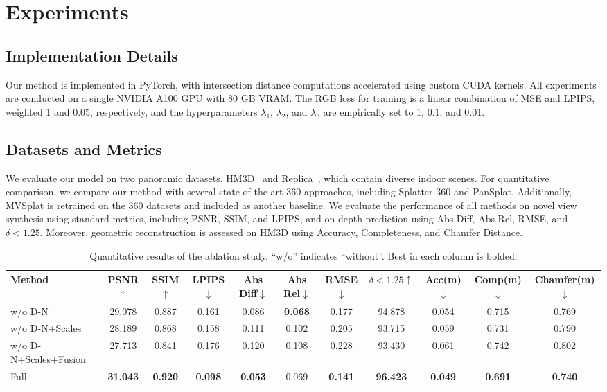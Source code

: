 \section{Experiments}\label{sec:experiments}

\subsection{Implementation Details}\label{subsec:details}Our method is implemented in PyTorch, with intersection distance computations accelerated using custom CUDA kernels. All experiments are conducted on a single NVIDIA A100 GPU with 80 GB VRAM. The RGB loss for training is a linear combination of MSE and LPIPS, weighted 1 and 0.05, respectively, and the hyperparameters $\lambda_1$, $\lambda_2$, and $\lambda_3$ are empirically set to 1, 0.1, and 0.01.

\subsection{Datasets and Metrics}\label{subsec:datasets}We evaluate our model on two panoramic datasets, HM3D~\cite{hm3d} and Replica~\cite{replica}, which contain diverse indoor scenes. For quantitative comparison, we compare our method with several state-of-the-art 360 approaches, including Splatter-360 and PanSplat. Additionally, MVSplat is retrained on the 360 datasets and included as another baseline. We evaluate the performance of all methods on novel view synthesis using standard metrics, including PSNR, SSIM, and LPIPS, and on depth prediction using Abs Diff, Abs Rel, RMSE, and $\delta < 1.25$. Moreover, geometric reconstruction is assessed on HM3D using Accuracy, Completeness, and Chamfer Distance.

\renewcommand{\arraystretch}{0.70}
\begin{table}[htbp]
  \centering  
  \scriptsize
    \caption{Quantitative results of the ablation study. ``w/o'' indicates ``without''. Best in each column is bolded. }
  \label{tab:ablation_full}
  \setlength{\tabcolsep}{3pt}
  \begin{tabular}{lccc|ccccccc}
    \toprule
    Method & PSNR$\uparrow$ & SSIM$\uparrow$ & LPIPS$\downarrow$ & 
    Abs Diff$\downarrow$ & Abs Rel$\downarrow$ & RMSE$\downarrow$ & $\delta<1.25\uparrow$ &
    Acc(m)$\downarrow$ & Comp(m)$\downarrow$ & Chamfer(m)$\downarrow$ \\
    \midrule
    w/o D-N & 29.078 & 0.887 & 0.161 & 0.086 & \textbf{0.068} & 0.177 & 94.878 & 0.054 & 0.715 & 0.769 \\
    w/o D-N+Scales & 28.189 & 0.868 & 0.158 & 0.111 & 0.102 & 0.205 & 93.715 & 0.059 & 0.731 & 0.790 \\
    w/o D-N+Scales+Fusion & 27.713 & 0.841 & 0.176 & 0.120 & 0.108 & 0.228 & 93.430 & 0.061 & 0.742 & 0.802 \\
    Full & \textbf{31.043} & \textbf{0.920} & \textbf{0.098} & \textbf{0.053} & 0.069 & \textbf{0.141} & \textbf{96.423} & \textbf{0.049} & \textbf{0.691} & \textbf{0.740} \\
    \bottomrule
  \end{tabular}
\end{table}

